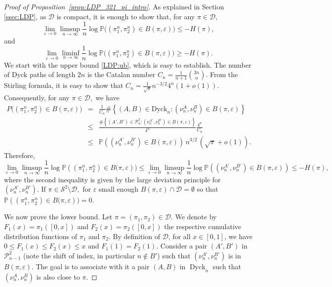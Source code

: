 \documentclass[a4paper,11pt]{amsart}
\DeclareMathOperator{\Dyck}{Dyck}
\theoremstyle{definition}
\begin{document}
\begin{proof}[Proof of Proposition~\ref{prop:LDP_321_pi_intro}]
As explained in Section \ref{ssec:LDP}, as $\mathcal D$ is compact, it is enough to show that, for any $\pi \in \mathcal D,$
\begin{equation}\label{LDP:ub}
 \lim_{\varepsilon \to 0} \limsup_{n \to \infty} \frac{1}{n} \log \mathbb P\big( \left( \pi_1^n, \pi_2^n \right) \in B(\pi, \varepsilon) \big) \le - H(\pi),
\end{equation}
and
\begin{equation}\label{LDP:lb}
 \lim_{\varepsilon \to 0} \liminf_{n \to \infty} \frac{1}{n} \log\mathbb P\big( \left( \pi_1^n, \pi_2^n \right) \in B(\pi, \varepsilon)  \big) \ge - H(\pi).
\end{equation}
We start with the upper bound \eqref{LDP:ub}, which is easy to establish.
The number of Dyck paths of length $2n$ is the Catalan number $C_n = \frac{1}{n+1}\binom{2n}{n}.$ From the Stirling formula, it is easy to show that $C_n=\frac{1}{\sqrt{\pi}}n^{-3/2}4^n(1+o(1)).$ Consequently, for any  $\pi \in \mathcal D,$ we have
\begin{eqnarray*}
 P\big( \left( \pi_1^n, \pi_2^n \right) \in B(\pi, \varepsilon)  \big)& = &
 \frac{1}{C_n}  \#  \left\{ (A,B) \in  \mathrm{Dyck}_n : (\nu_n^A, \nu_n^B) \in B(\pi, \varepsilon)\right\}\\
& \le & \frac{\#  \left\{ (A',B') \in \mathcal P_{n}^2 : (\nu_n^{A'}, \nu_n^{B'}) \in B(\pi, \varepsilon)\right\}}{4^{n}} \frac{4^{n} }{C_n} \\
& \le  &   \mathbb P \left( \left(\nu_n^{A'}, \nu_n^{B'}\right) \in B(\pi, \varepsilon) \right) \, n^{3/2} \, (\sqrt{\pi}+o(1)).
 \end{eqnarray*}
Therefore,
\[\! \lim_{\varepsilon \to 0} \limsup_{n \to \infty} \frac{1}{n} \log\mathbb P\left( \left( \pi_1^n, \pi_2^n \right) \in B(\pi, \varepsilon\right)) \le \lim_{\varepsilon \to 0} \limsup_{n \to \infty} \frac{1}{n} \log \mathbb P\left( \left( \nu_n^{A'}, \nu_n^{B'}\right) \in B(\pi, \varepsilon)\right) \le - H(\pi),\]
where the second inequality is given by the large deviation principle for $(\nu_n^{A'}, \nu_n^{B'})$.
If $\pi \in \mathcal S^2 \setminus \mathcal D,$ for $\varepsilon$ small enough $B(\pi, \varepsilon) \cap \mathcal{D} = \emptyset$ so that
$ \mathbb P\left( \left( \pi_1^n, \pi_2^n \right) \in B(\pi, \varepsilon\right)) =0.$


We now prove the lower bound. Let $\pi = (\pi_1, \pi_2) \in \mathcal D$. 
We denote by $F_1(x) = \pi_1([0,x])$ and   $F_2(x) = \pi_2([0,x])$ the respective cumulative distribution functions of $\pi_1$ and $\pi_2$.
By definition of $\mathcal D$, for all $ x \in [0,1]$, we have $0 \le F_1(x) \le F_2(x) \le x$ and $F_1(1)=F_2(1)$.
Consider a pair $(A',B')$ in $\mathcal P_{n-1}^2$ (note the shift of index, in particular $n \notin B'$) such that $(\nu_n^{A'},\nu_n^{B'})$ is in $B(\pi ,\varepsilon)$.
The goal is to associate with it a pair $(A,B)$ in $\Dyck_n$ such that $(\nu_n^A,\nu_n^B)$ is also close to $\pi$.


\end{proof}
\end{document}
